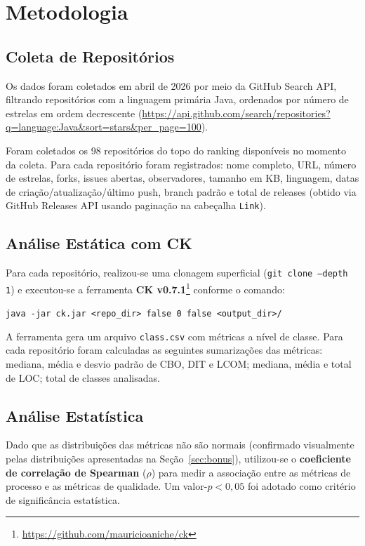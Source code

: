 \documentclass[12pt,a4paper]{article}
\begin{document}
\section{Metodologia}

\subsection{Coleta de Repositórios}

Os dados foram coletados em abril de 2026 por meio da GitHub Search API,
filtrando repositórios com a linguagem primária Java, ordenados por número
de estrelas em ordem decrescente
(\url{https://api.github.com/search/repositories?q=language:Java&sort=stars&per_page=100}).

Foram coletados os 98 repositórios do topo do ranking disponíveis no momento
da coleta. Para cada repositório foram registrados: nome completo, URL, número
de estrelas, forks, issues abertas, observadores, tamanho em KB, linguagem,
datas de criação/atualização/último push, branch padrão e total de releases
(obtido via GitHub Releases API usando paginação na cabeçalha \texttt{Link}).

\subsection{Análise Estática com CK}

Para cada repositório, realizou-se uma clonagem superficial
(\texttt{git clone --depth 1}) e executou-se a ferramenta
\textbf{CK v0.7.1}\footnote{\url{https://github.com/mauricioaniche/ck}}
conforme o comando:

\begin{center}
\texttt{java -jar ck.jar <repo\_dir> false 0 false <output\_dir>/}
\end{center}

A ferramenta gera um arquivo \texttt{class.csv} com métricas a nível de classe.
Para cada repositório foram calculadas as seguintes sumarizações das métricas:
mediana, média e desvio padrão de CBO, DIT e LCOM; mediana, média e total de LOC;
total de classes analisadas.

\subsection{Análise Estatística}

Dado que as distribuições das métricas não são normais (confirmado visualmente
pelas distribuições apresentadas na Seção~\ref{sec:bonus}), utilizou-se o
\textbf{coeficiente de correlação de Spearman} ($\rho$) para medir a associação
entre as métricas de processo e as métricas de qualidade.
Um valor-$p < 0,05$ foi adotado como critério de significância estatística.
\end{document}
